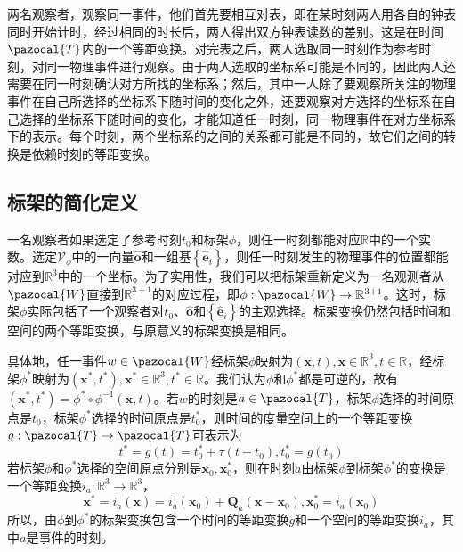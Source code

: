 \documentclass[main.tex]{subfiles}
\begin{document}
两名观察者，观察同一事件，他们首先要相互对表，即在某时刻两人用各自的钟表同时开始计时，经过相同的时长后，两人得出双方钟表读数的差别。这是在时间$\pazocal{T}$内的一个等距变换。对完表之后，两人选取同一时刻作为参考时刻，对同一物理事件进行观察。由于两人选取的坐标系可能是不同的，因此两人还需要在同一时刻确认对方所找的坐标系；然后，其中一人除了要观察所关注的物理事件在自己所选择的坐标系下随时间的变化之外，还要观察对方选择的坐标系在自己选择的坐标系下随时间的变化，才能知道任一时刻，同一物理事件在对方坐标系下的表示。每个时刻，两个坐标系的之间的关系都可能是不同的，故它们之间的转换是依赖时刻的等距变换。

\subsection{标架的简化定义}
一名观察者如果选定了参考时刻$t_0$和标架$\phi$，则任一时刻都能对应$\mathbb{R}$中的一个实数。选定$\mathcal{V}_\phi$中的一向量$\mathbf{\hat{o}}$和一组基$\left\{\mathbf{\hat{e}}_i\right\}$，则任一时刻发生的物理事件的位置都能对应到$\mathbb{R}^3$中的一个坐标。为了实用性，我们可以把标架重新定义为一名观测者从$\pazocal{W}$直接到$\mathbb{R}^{3+1}$的对应过程，即$\phi:\pazocal{W}\rightarrow\mathbb{R}^{3+1}$。这时，标架$\phi$实际包括了一个观察者对$t_0$、$\mathbf{\hat{o}}$和$\left\{\mathbf{\hat{e}}_i\right\}$的主观选择。标架变换仍然包括时间和空间的两个等距变换，与原意义的标架变换是相同。

具体地，任一事件$w\in\pazocal{W}$经标架$\phi$映射为$\left(\mathbf{x},t\right),\mathbf{x}\in\mathbb{R}^3,t\in\mathbb{R}$，经标架$\phi^*$映射为$\left(\mathbf{x}^*,t^*\right),\mathbf{x}^*\in\mathbb{R}^3,t^*\in\mathbb{R}$。我们认为$\phi$和$\phi^*$都是可逆的，故有$\left(\mathbf{x}^*,t^*\right)=\phi^*\circ\phi^{-1}\left(\mathbf{x},t\right)$。若$w$的时刻是$a\in\pazocal{T}$，标架$\phi$选择的时间原点是$t_0$，标架$\phi^*$选择的时间原点是$t_0^*$，则时间的度量空间上的一个等距变换$g:\pazocal{T}\rightarrow\pazocal{T}$可表示为
\[t^*=g\left(t\right)=t_0^*+\tau\left(t-t_0\right),t_0^*=g\left(t_0\right)\]
若标架$\phi$和$\phi^*$选择的空间原点分别是$\mathbf{x}_0,\mathbf{x}_0^*$，则在时刻$a$由标架$\phi$到标架$\phi^*$的变换是一个等距变换$i_a:\mathbb{R}^3\rightarrow\mathbb{R}^3$，
\[\mathbf{x}^*=i_a\left(\mathbf{x}\right)=i_a\left(\mathbf{x}_0\right)+\mathbf{Q}_a\left(\mathbf{x}-\mathbf{x}_0\right),\mathbf{x}_0^*=i_a\left(\mathbf{x}_0\right)\]
所以，由$\phi$到$\phi^*$的标架变换包含一个时间的等距变换$g$和一个空间的等距变换$i_a$，其中$a$是事件的时刻。
\end{document}
